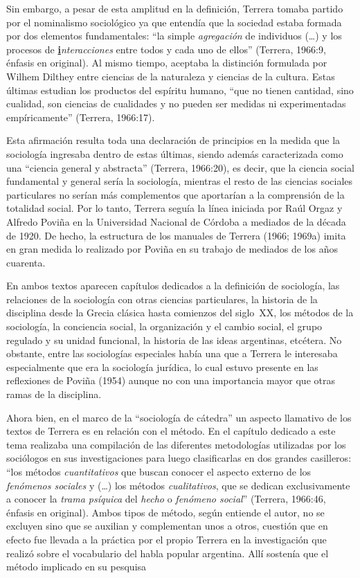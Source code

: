 Sin embargo, a pesar de esta amplitud en la definición, Terrera tomaba partido por el nominalismo sociológico ya que entendía que la sociedad estaba formada por dos elementos fundamentales: ``la simple \emph{agregación} de individuos (\dots) y los procesos de \textbf{\ul{i}}\emph{nteracciones} entre todos y cada uno de ellos'' (Terrera, 1966:9, énfasis en original). Al mismo tiempo, aceptaba la distinción formulada por Wilhem Dilthey entre ciencias de la naturaleza y ciencias de la cultura. Estas últimas estudian los productos del espíritu humano, ``que no tienen cantidad, sino cualidad, son ciencias de cualidades y no pueden ser medidas ni experimentadas empíricamente'' (Terrera, 1966:17).

Esta afirmación resulta toda una declaración de principios en la medida que la sociología ingresaba dentro de estas últimas, siendo además caracterizada como una ``ciencia general y abstracta'' (Terrera, 1966:20), es decir, que la ciencia social fundamental y general sería la sociología, mientras el resto de las ciencias sociales particulares no serían más complementos que aportarían a la comprensión de la totalidad social. Por lo tanto, Terrera seguía la línea iniciada por Raúl Orgaz y Alfredo Poviña en la Universidad Nacional de Córdoba a mediados de la década de 1920. De hecho, la estructura de los manuales de Terrera (1966; 1969a) imita en gran medida lo realizado por Poviña en su trabajo de mediados de los años cuarenta.

En ambos textos aparecen capítulos dedicados a la definición de sociología, las relaciones de la sociología con otras ciencias particulares, la historia de la disciplina desde la Grecia clásica hasta comienzos del siglo~XX, los métodos de la sociología, la conciencia social, la organización y el cambio social, el grupo regulado y su unidad funcional, la historia de las ideas argentinas, etcétera. No obstante, entre las sociologías especiales había una que a Terrera le interesaba especialmente que era la sociología jurídica, lo cual estuvo presente en las reflexiones de Poviña (1954) aunque no con una importancia mayor que otras ramas de la disciplina.

Ahora bien, en el marco de la ``sociología de cátedra'' un aspecto llamativo de los textos de Terrera es en relación con el método. En el capítulo dedicado a este tema realizaba una compilación de las diferentes metodologías utilizadas por los sociólogos en sus investigaciones para luego clasificarlas en dos grandes casilleros: ``los métodos \emph{cuantitativos} que buscan conocer el aspecto externo de los \emph{fenómenos sociales} y (\dots) los métodos \emph{cualitativos}, que se dedican exclusivamente a conocer la \emph{trama psíquica} del \emph{hecho} o \emph{fenómeno social}'' (Terrera, 1966:46, énfasis en original). Ambos tipos de método, según entiende el autor, no se excluyen sino que se auxilian y complementan unos a otros, cuestión que en efecto fue llevada a la práctica por el propio Terrera en la investigación que realizó sobre el vocabulario del habla popular argentina. Allí sostenía que el método implicado en su pesquisa

